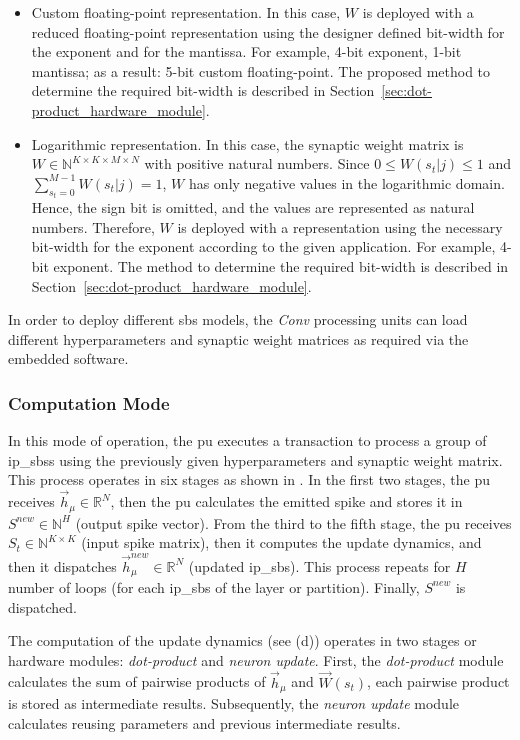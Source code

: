 \begin{itemize}
	\item{Custom floating-point representation}.
	In this case, $W$ is deployed with a reduced floating-point representation using the designer defined bit-width for the exponent and for the mantissa. For example, 4-bit exponent, 1-bit mantissa; as a result: 5-bit custom floating-point. The proposed method to determine the required bit-width is described in Section~{\ref{sec:dot-product_hardware_module}}.
	\item{Logarithmic representation}.
	In this case, the synaptic weight matrix is $W\in\mathbb{N}^{K\times K\times M\times N}$ with positive natural numbers. Since $0\le W(s_t|j)\le1$ and $\sum_{s_t=0}^{M-1}W(s_t|j)=1$, $W$ has only negative values in the logarithmic domain. Hence, the sign bit is omitted, and the values are represented as natural numbers. Therefore, $W$ is deployed with a representation using the necessary bit-width for the exponent according to the given application. For example, 4-bit exponent. The method to determine the required bit-width is described in Section~{\ref{sec:dot-product_hardware_module}}.
\end{itemize}

In order to deploy different \gls{sbs} models, the \emph{Conv} processing units can load different hyperparameters and synaptic weight matrices as required via the embedded software.

\subsubsection{Computation Mode}
In this mode of operation, the \gls{pu} executes a transaction to process a group of \glspl{ip_sbs} using the previously given hyperparameters and synaptic weight matrix. This process operates in six stages as shown in . In the first two stages, the \gls{pu} receives $\vec{h}_\mu\in\mathbb{R}^{N}$, then the \gls{pu} calculates the emitted spike and stores it in $S^{new}\in\mathbb{N}^{H}$ (output spike vector). From the third to the fifth stage, the \gls{pu} receives $S_t\in\mathbb{N}^{K\times K}$ (input spike matrix), then it computes the update dynamics, and then it dispatches $\vec{h}_\mu^{new}\in\mathbb{R}^{N}$ (updated \gls{ip_sbs}). This process repeats for $H$ number of loops (for each \gls{ip_sbs} of the layer or partition). Finally, $S^{new}$ is dispatched.

The computation of the update dynamics (see (d)) operates in two stages or hardware modules: \emph{dot-product} and \emph{neuron update}. First, the \emph{dot-product} module calculates the sum of pairwise products of $\vec{h}_{\mu}$ and $\vec{W}(s_t)$, each pairwise product is stored as intermediate results. Subsequently, the \emph{neuron update} module calculates  reusing parameters and previous intermediate results.


